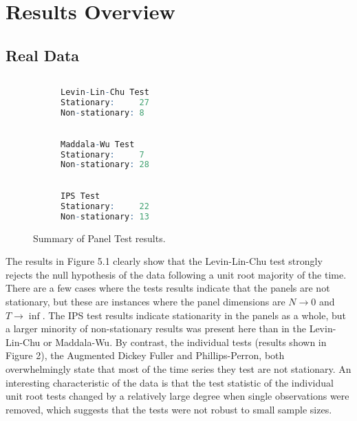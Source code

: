 \section{Results Overview}

\subsection{Real Data}
\begin{figure}[htp]
	\centering
	\begin{subfigure}{0.3\textwidth}
		\centering
		\begin{lstlisting}[language=R,basicstyle=\tiny]
		
Levin-Lin-Chu Test
Stationary:     27
Non-stationary: 8

		\end{lstlisting}
	\end{subfigure}
\begin{subfigure}{0.3\textwidth}
	\centering
	\begin{lstlisting}[language=R,basicstyle=\tiny]

Maddala-Wu Test
Stationary:     7
Non-stationary: 28

	\end{lstlisting}
\end{subfigure}
\begin{subfigure}{0.3\textwidth}
	\centering
	\begin{lstlisting}[language=R,basicstyle=\tiny]

IPS Test
Stationary:     22
Non-stationary: 13

	\end{lstlisting}
\end{subfigure}

\caption{Summary of Panel Test results.}
\end{figure}


The results in Figure 5.1 clearly show that the Levin-Lin-Chu test strongly rejects the null hypothesis of the data following a unit root majority of the time. There are a few cases where the tests results indicate that the panels are not stationary, but these are instances where the panel dimensions are $N \to 0$ and $T \to \inf$. The IPS test results indicate stationarity in the panels as a whole, but a larger minority of non-stationary results was present here than in the Levin-Lin-Chu or Maddala-Wu. By contrast, the individual tests (results shown in Figure 2), the Augmented Dickey Fuller and Phillips-Perron, both overwhelmingly state that most of the time series they test are not stationary. An interesting characteristic of the data is that the test statistic of the individual unit root tests changed by a relatively large degree when single observations were removed, which suggests that the tests were not robust to small sample sizes.

